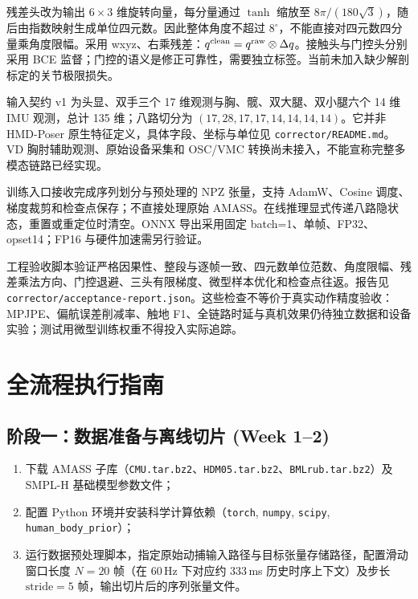 \documentclass[UTF8,11pt,a4paper]{ctexart}
\begin{document}
残差头改为输出 $6\times3$ 维旋转向量，每分量通过 $\tanh$ 缩放至 $8\pi/(180\sqrt{3})$，随后由指数映射生成单位四元数。因此整体角度不超过 $8^\circ$，不能直接对四元数四分量乘角度限幅。采用 wxyz、右乘残差：$q^{\rm clean}=q^{\rm raw}\otimes\Delta q$。接触头与门控头分别采用 BCE 监督；门控的语义是修正可靠性，需要独立标签。当前未加入缺少解剖标定的关节极限损失。

输入契约 v1 为头显、双手三个 17 维观测与胸、髋、双大腿、双小腿六个 14 维 IMU 观测，总计 135 维；八路切分为 $(17,28,17,17,14,14,14,14)$。它并非 HMD-Poser 原生特征定义，具体字段、坐标与单位见 \texttt{corrector/README.md}。VD 胸肘辅助观测、原始设备采集和 OSC/VMC 转换尚未接入，不能宣称完整多模态链路已经实现。

训练入口接收完成序列划分与预处理的 NPZ 张量，支持 AdamW、Cosine 调度、梯度裁剪和检查点保存；不直接处理原始 AMASS。在线推理显式传递八路隐状态，重置或重定位时清空。ONNX 导出采用固定 batch=1、单帧、FP32、opset14；FP16 与硬件加速需另行验证。

工程验收脚本验证严格因果性、整段与逐帧一致、四元数单位范数、角度限幅、残差乘法方向、门控退避、三头有限梯度、微型样本优化和检查点往返。报告见 \texttt{corrector/acceptance-report.json}。这些检查不等价于真实动作精度验收：MPJPE、偏航误差削减率、触地 F1、全链路时延与真机效果仍待独立数据和设备实验；测试用微型训练权重不得投入实际追踪。

\section{全流程执行指南}
\label{sec:execution}

\subsection{阶段一：数据准备与离线切片 (Week 1--2)}
\begin{enumerate}
    \item 下载 AMASS 子库（\texttt{CMU.tar.bz2}、\texttt{HDM05.tar.bz2}、\texttt{BMLrub.tar.bz2}）及 SMPL-H 基础模型参数文件；
    \item 配置 Python 环境并安装科学计算依赖（\texttt{torch}, \texttt{numpy}, \texttt{scipy}, \texttt{human\_body\_prior}）；
    \item 运行数据预处理脚本，指定原始动捕输入路径与目标张量存储路径，配置滑动窗口长度 $N=20$ 帧（在 60\,Hz 下对应约 333\,ms 历史时序上下文）及步长 $\text{stride}=5$ 帧，输出切片后的序列张量文件。
\end{enumerate}
\end{document}
